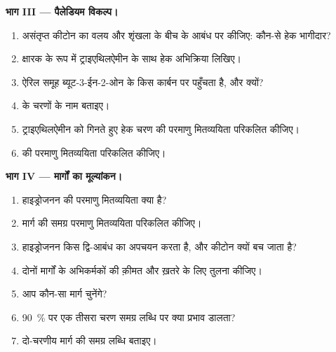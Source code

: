\begin{problem}
\medskip
\noindent\textbf{भाग III --- पैलेडियम विकल्प।}
\begin{enumerate}[resume]
  \item असंतृप्त कीटोन का वलय और शृंखला के बीच के आबंध पर  कीजिए: कौन-से हेक
        भागीदार?
  \item क्षारक के रूप में ट्राइएथिलऐमीन के साथ हेक अभिक्रिया लिखिए।
  \item ऐरिल समूह ब्यूट-3-ईन-2-ओन के किस कार्बन पर पहुँचता है, और क्यों?
  \item {} के चरणों के नाम बताइए।
  \item ट्राइएथिलऐमीन को गिनते हुए हेक चरण की परमाणु मितव्ययिता परिकलित कीजिए।
  \item {} की परमाणु मितव्ययिता परिकलित कीजिए।
\end{enumerate}

\medskip
\noindent\textbf{भाग IV --- मार्गों का मूल्यांकन।}
\begin{enumerate}[resume]
  \item हाइड्रोजनन की परमाणु मितव्ययिता क्या है?
  \item {} मार्ग की समग्र परमाणु मितव्ययिता परिकलित कीजिए।
  \item हाइड्रोजनन किस द्वि-आबंध का अपचयन करता है, और कीटोन क्यों बच जाता है?
  \item दोनों मार्गों के अभिकर्मकों की क़ीमत और ख़तरे के लिए तुलना कीजिए।
  \item आप कौन-सा मार्ग चुनेंगे?
  \item 90~\% पर एक तीसरा चरण समग्र लब्धि पर क्या प्रभाव डालता?
  \item दो-चरणीय  मार्ग की समग्र लब्धि बताइए।
\end{enumerate}
\end{problem}
